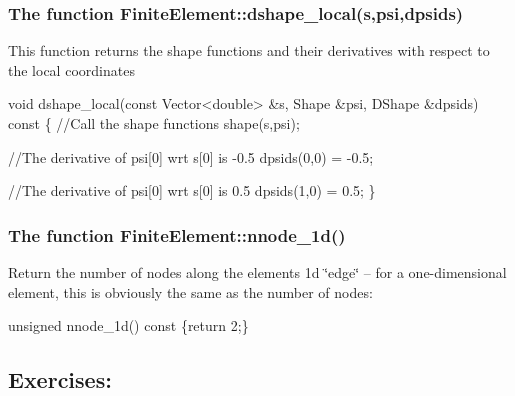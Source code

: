 \hypertarget{index_dshape}{}\subsubsection{The function Finite\+Element\+::dshape\+\_\+local(s,psi,dpsids)}\label{index_dshape}
This function returns the shape functions and their derivatives with respect to the local coordinates 
\begin{DoxyCodeInclude}
 \textcolor{keywordtype}{void} dshape\_local(\textcolor{keyword}{const} Vector<double> &s, Shape &psi, DShape &dpsids) \textcolor{keyword}{const}
  \{
   \textcolor{comment}{//Call the shape functions}
   shape(s,psi);

   \textcolor{comment}{//The derivative of psi[0] wrt s[0] is -0.5}
   dpsids(0,0) = -0.5;

   \textcolor{comment}{//The derivative of psi[0] wrt s[0] is 0.5}
   dpsids(1,0) = 0.5;
  \}

\end{DoxyCodeInclude}
\hypertarget{index_nnode_1d}{}\subsubsection{The function Finite\+Element\+::nnode\+\_\+1d()}\label{index_nnode_1d}
Return the number of nodes along the element\textquotesingle{}s 1d \char`\"{}edge\char`\"{} -- for a one-\/dimensional element, this is obviously the same as the number of nodes\+: 
\begin{DoxyCodeInclude}
 \textcolor{keywordtype}{unsigned} nnode\_1d()\textcolor{keyword}{ const }\{\textcolor{keywordflow}{return} 2;\}

\end{DoxyCodeInclude}




 \hypertarget{index_geom_element_exercise}{}\subsection{Exercises\+:}\label{index_geom_element_exercise}


